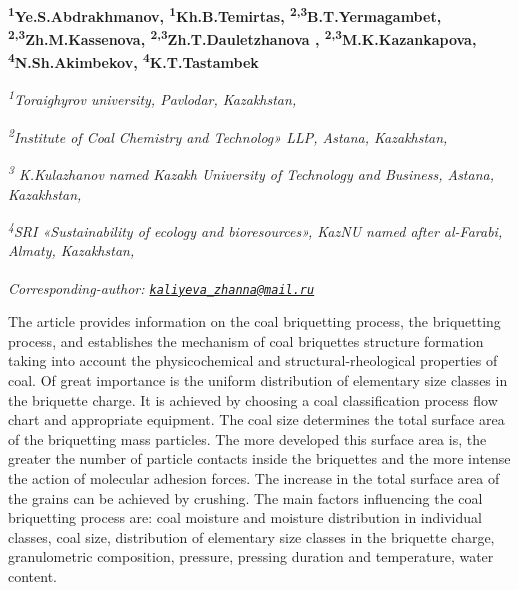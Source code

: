 
\begin{articleheader}

{\bfseries
\textsuperscript{1}Ye.S.Abdrakhmanov\authorid,
\textsuperscript{1}Kh.B.Temirtas\authorid,
\textsuperscript{2,3}B.T.Yermagambet\authorid,
\textsuperscript{2,3}Zh.M.Kassenova\authorid,
\textsuperscript{2,3}Zh.T.Dauletzhanova\textsuperscript{\envelope } \authorid,
\textsuperscript{2,3}M.K.Kazankapova\authorid,
\textsuperscript{4}N.Sh.Akimbekov\authorid,
\textsuperscript{4}K.T.Tastambek\authorid}
\end{articleheader}

\begin{affiliation}
\emph{\textsuperscript{1}Toraighyrov university, Pavlodar, Kazakhstan,}

\emph{\textsuperscript{2}Institute of Coal Chemistry and Technolog» LLP, Astana, Kazakhstan,}

\emph{\textsuperscript{3} K.Kulazhanov named Kazakh University of Technology and Business, Astana, Kazakhstan,}

\emph{\textsuperscript{4}SRI «Sustainability of ecology and bioresources», KazNU named after al-Farabi, Almaty, Kazakhstan,}

\raggedright \textsuperscript{\envelope }{\em Corresponding-author: \href{mailto:kaliyeva_zhanna@mail.ru}{\nolinkurl{kaliyeva\_zhanna@mail.ru}}}
\end{affiliation}

The article provides information on the coal briquetting process, the
briquetting process, and establishes the mechanism of coal briquettes
structure formation taking into account the physicochemical and
structural-rheological properties of coal. Of great importance is the
uniform distribution of elementary size classes in the briquette charge.
It is achieved by choosing a coal classification process flow chart and
appropriate equipment. The coal size determines the total surface area
of the briquetting mass particles. The more developed this surface area
is, the greater the number of particle contacts inside the briquettes
and the more intense the action of molecular adhesion forces. The
increase in the total surface area of the grains can be achieved by
crushing. The main factors influencing the coal briquetting process are:
coal moisture and moisture distribution in individual classes, coal
size, distribution of elementary size classes in the briquette charge,
granulometric composition, pressure, pressing duration and temperature,
water content.

